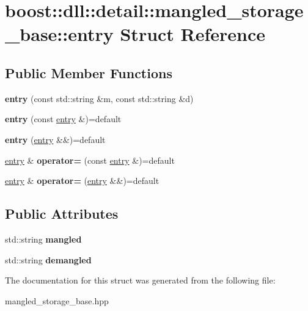 \hypertarget{a01384}{}\section{boost\+:\+:dll\+:\+:detail\+:\+:mangled\+\_\+storage\+\_\+base\+:\+:entry Struct Reference}
\label{a01384}
\subsection*{Public Member Functions}
\begin{DoxyCompactItemize}
\item 
\mbox{\label{a01384_aa25c89fd07d608756ab413b9899af332}} 
{\bfseries entry} (const std\+::string \&m, const std\+::string \&d)
\item 
\mbox{\label{a01384_aeeacd3b3b5541903802e9cde71f2125e}} 
{\bfseries entry} (const \hyperlink{a01384}{entry} \&)=default
\item 
\mbox{\label{a01384_abd8831ea9bb6fa1f14672b988eca66f5}} 
{\bfseries entry} (\hyperlink{a01384}{entry} \&\&)=default
\item 
\mbox{\label{a01384_a3f3f71d35d817282b3a7be1a834ea196}} 
\hyperlink{a01384}{entry} \& {\bfseries operator=} (const \hyperlink{a01384}{entry} \&)=default
\item 
\mbox{\label{a01384_acd12159970ef77556cca244fbbaf3366}} 
\hyperlink{a01384}{entry} \& {\bfseries operator=} (\hyperlink{a01384}{entry} \&\&)=default
\end{DoxyCompactItemize}
\subsection*{Public Attributes}
\begin{DoxyCompactItemize}
\item 
\mbox{\label{a01384_aaf727476edc89f98715451a57df11313}} 
std\+::string {\bfseries mangled}
\item 
\mbox{\label{a01384_ae15d9b4dcd34a307d2064d5a2a67f58c}} 
std\+::string {\bfseries demangled}
\end{DoxyCompactItemize}


The documentation for this struct was generated from the following file\+:\begin{DoxyCompactItemize}
\item 
mangled\+\_\+storage\+\_\+base.\+hpp\end{DoxyCompactItemize}
